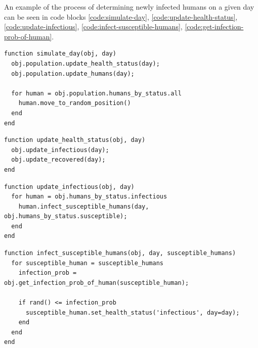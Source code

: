\documentclass[a4paper]{article}
\newcommand{\code}{\texttt}
\begin{document}
An example of the process of determining newly infected humans on a given day can be seen in code blocks \ref{code:simulate-day}, \ref{code:update-health-status}, \ref{code:update-infectious}, \ref{code:infect-susceptible-humans}, \ref{code:get-infection-prob-of-human}.

\begin{lstlisting}[caption={Function for simulating one day, where \code{obj} is \code{city}.}, captionpos=b, label={code:simulate-day}]
function simulate_day(obj, day)	
  obj.population.update_health_status(day);
  obj.population.update_humans(day);
	
  for human = obj.population.humans_by_status.all
    human.move_to_random_position()
  end
end
\end{lstlisting}


\begin{lstlisting}[caption={Function for updating the health status of the population on a given day, where \code{obj} is \code{population}.}, captionpos=b, label={code:update-health-status}]
function update_health_status(obj, day)		
  obj.update_infectious(day);
  obj.update_recovered(day);
end
\end{lstlisting}

\begin{lstlisting}[caption={Function for updating infectious humans, i.e., deciding which susceptible humans will every infectious humans infect, on a given day, where \code{obj} is \code{population}.}, captionpos=b, label={code:update-infectious}]
function update_infectious(obj, day)
  for human = obj.humans_by_status.infectious
    human.infect_susceptible_humans(day, obj.humans_by_status.susceptible);
  end
end
\end{lstlisting}

\begin{lstlisting}[caption={Function for infecting susceptible humans by an infectious human on a given day, where \code{obj} is \code{human} - specifically, an instance of \code{human} whose health status is infectious.}, captionpos=b, label={code:infect-susceptible-humans}]
function infect_susceptible_humans(obj, day, susceptible_humans)
  for susceptible_human = susceptible_humans                
    infection_prob = obj.get_infection_prob_of_human(susceptible_human);

    if rand() <= infection_prob
      susceptible_human.set_health_status('infectious', day=day);
    end
  end                
end
\end{lstlisting}
\end{document}
